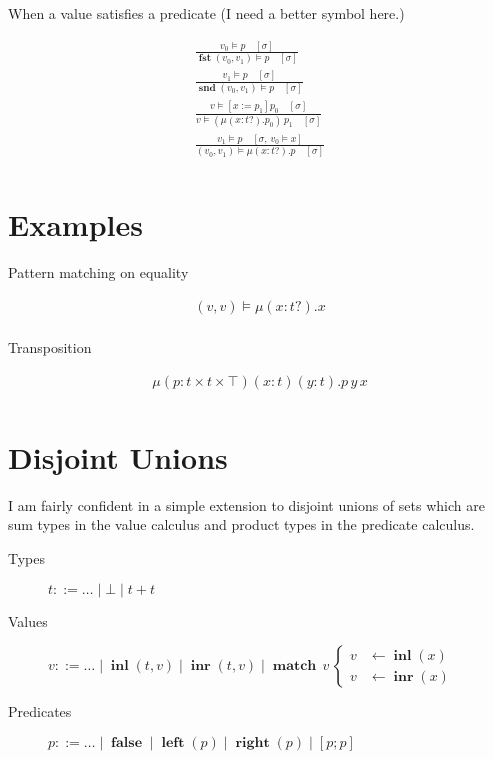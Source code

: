 \documentclass[twocolumn, fleqn]{scrartcl}
\newcommand{\bnfdef}{\mathbin{::=}}
\DeclareMathOperator{\fst}{\textbf{fst}}
\DeclareMathOperator{\snd}{\textbf{snd}}
\DeclareMathOperator{\inl}{\textbf{inl}}
\DeclareMathOperator{\inr}{\textbf{inr}}
\DeclareMathOperator{\false}{\textbf{false}}
\DeclareMathOperator{\lft}{\textbf{left}}
\DeclareMathOperator{\rgt}{\textbf{right}}
\DeclareMathOperator{\update}{:=}
\DeclareMathOperator{\case}{\textbf{match}}
\begin{document}
When a value satisfies a predicate (I need a better symbol here.)

\begin{multline*}
\frac{
  v_0 \models p \quad [\sigma]
}{
  \fst ( v_0 , v_1 ) \models p \quad [\sigma]
}\\
\frac{
  v_1 \models p \quad [\sigma]
}{
  \snd ( v_0 , v_1 ) \models p \quad [\sigma]
}\\
\frac{
  v \models [x \update p_1] p_0 \quad [\sigma]
}{
  v \models ( \mu (x \colon t ?). p_0) \, p_1 \quad [\sigma]
}\\
\frac{
  v_1 \models p \quad [ \sigma , \, v_0 \models x]
}{
  ( v_0 , v_1 ) \models \mu (x \colon t ?). p \quad [\sigma]
}\\
\end{multline*}

\section*{Examples}

Pattern matching on equality

\begin{multline*}
   ( v , v ) \models \mu (x \colon t ?). x\\
\end{multline*}

Transposition

\begin{multline*}
   \mu (p \colon t \times t \times \top) (x \colon t) (y \colon t). p \, y \, x\\
\end{multline*}

\section*{Disjoint Unions}

I am fairly confident in a simple extension to disjoint unions
of sets which are sum types in the value calculus and product types in
the predicate calculus.

\begin{description}
\item[Types] \( t \bnfdef \ldots \mid \bot \mid t + t \)
\item[Values] \( v \bnfdef \ldots \mid \inl(t, v) \mid \inr(t, v) \mid
  \case \, v \,
  \begin{cases}
    v & \leftarrow \inl(x) \\
    v & \leftarrow \inr(x)
  \end{cases}
  \)
\item[Predicates] \( p \bnfdef \ldots \mid \false \mid \lft(p) \mid \rgt(p) \mid [ p ; p ] \)
\end{description}
\end{document}
